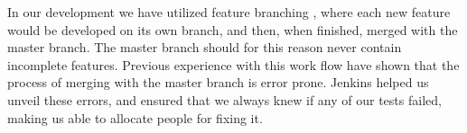 In our development we have utilized feature branching \parencite{feature_branching}, where each new feature would be developed on its own branch, and then, when finished, merged with the master branch. The master branch should for this reason never contain incomplete features. Previous experience with this work flow have shown that the process of merging with the master branch is error prone. Jenkins helped us unveil these errors, and ensured that we always knew if any of our tests failed, making us able to allocate people for fixing it. 
